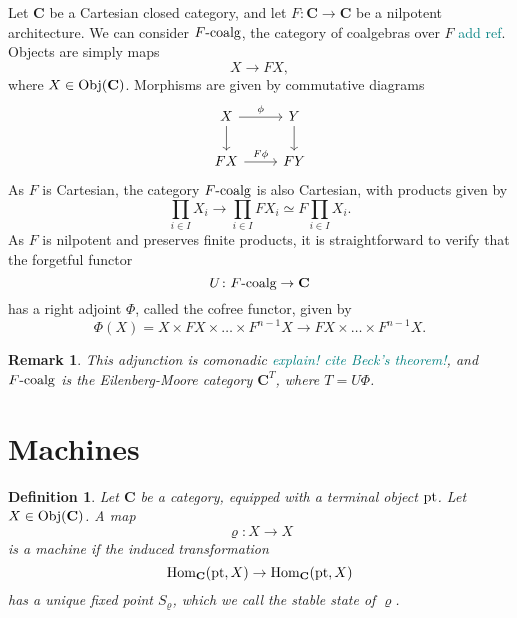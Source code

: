 \documentclass[12pt]{article}
\newtheorem{remark}{Remark}
\newtheorem{definition}{Definition}
\newcommand{\pietro}[1]{\textcolor{teal}{#1}}
\newcommand{\pt}{{\textnormal{pt}}}
\newcommand{\Hom}{{\textnormal{Hom}}}
\newcommand{\Obj}{{\textnormal{Obj}}}
\newcommand{\Cat}{{\mathbf{C}}}
\newcommand{\FCoalg}{{F\textnormal{-coalg}}}
\begin{document}
Let $\Cat$ be a Cartesian closed category, and let $F\colon \Cat \rightarrow \Cat$ be a nilpotent architecture. We can consider $\FCoalg$, the category of coalgebras over $F$ \pietro{add ref}. Objects are simply maps
\begin{equation*}
    X \rightarrow F X,
\end{equation*}
where $X \in \Obj(\Cat)$. Morphisms are given by commutative diagrams
\begin{equation*}
    \begin{tikzcd}
        X \arrow[rightarrow]{d} \arrow[rightarrow]{r}{\phi}
        & Y \arrow[rightarrow]{d} \\
        FX \arrow[rightarrow]{r}{F \phi}
        & FY
    \end{tikzcd}
\end{equation*}
As $F$ is Cartesian, the category $\FCoalg$ is also Cartesian, with products given by
\begin{equation*}
    \prod_{i \in I} X_i \rightarrow \prod_{i \in I} F X_i \simeq F \prod_{i \in I} X_i.
\end{equation*}
As $F$ is nilpotent and preserves finite products, it is straightforward to verify that the forgetful functor
\begin{equation*}
    U \colon \FCoalg \rightarrow \Cat
\end{equation*}
has a right adjoint $\Phi$, called the cofree functor, given by
\begin{equation*}
    \Phi(X) = X \times F X \times \dots \times F^{n-1} X \rightarrow F X \times \dots \times F^{n-1} X.
\end{equation*}

\begin{remark}
    This adjunction is comonadic \pietro{explain! cite Beck's theorem!}, and $\FCoalg$ is the Eilenberg-Moore category $\Cat^T$, where $T = U\Phi$.
\end{remark}

\section{Machines}

\begin{definition}\label{def:machine}
    Let $\Cat$ be a category, equipped with a terminal object $\pt$. Let $X \in \Obj(\Cat)$. A map
    \begin{equation*}
        \varrho \colon X \rightarrow X
    \end{equation*}
    is a {\em machine} if the induced transformation
    \begin{equation*}
        \Hom_\Cat(\pt, X) \rightarrow \Hom_\Cat(\pt, X)
    \end{equation*}
    has a unique fixed point $S_\varrho$, which we call the {\em stable state} of $\varrho$.
\end{definition}
\end{document}
